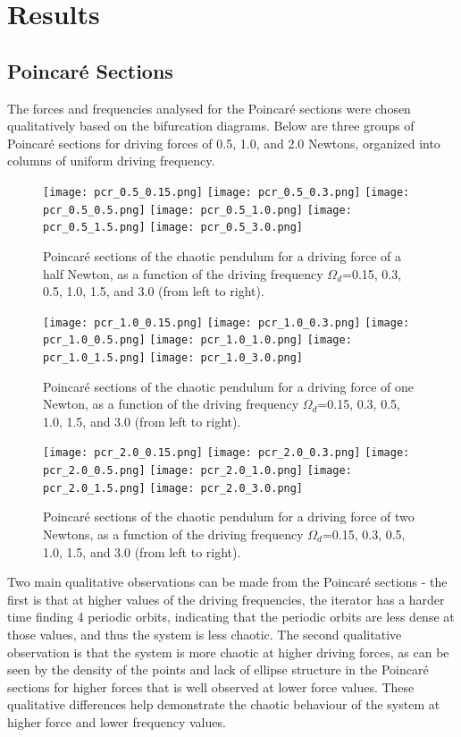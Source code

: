 \documentclass[11pt]{article} %
\begin{document}
\section{Results}
    \subsection{Poincar\'e Sections}
    The forces and frequencies analysed for the Poincar\'e sections were chosen qualitatively based on the bifurcation diagrams. Below are
    three groups of Poincar\'e sections for driving forces of 0.5, 1.0, and 2.0 Newtons, organized into columns of uniform driving frequency. 
    \begin{figure}[H]
        \centering
        \texttt{[image: pcr\_0.5\_0.15.png]}
        \texttt{[image: pcr\_0.5\_0.3.png]}
        \texttt{[image: pcr\_0.5\_0.5.png]}
        \texttt{[image: pcr\_0.5\_1.0.png]}
        \texttt{[image: pcr\_0.5\_1.5.png]}
        \texttt{[image: pcr\_0.5\_3.0.png]}
        \caption{Poincar\'e sections of the chaotic pendulum for a driving force of a half Newton, as a function of the driving frequency $\Omega_d$=0.15, 0.3, 0.5, 1.0, 1.5, and 3.0 (from left to right).}
    \end{figure}
    \begin{figure}[H]
        \centering
        \texttt{[image: pcr\_1.0\_0.15.png]}
        \texttt{[image: pcr\_1.0\_0.3.png]}
        \texttt{[image: pcr\_1.0\_0.5.png]}
        \texttt{[image: pcr\_1.0\_1.0.png]}
        \texttt{[image: pcr\_1.0\_1.5.png]}
        \texttt{[image: pcr\_1.0\_3.0.png]}
        \caption{Poincar\'e sections of the chaotic pendulum for a driving force of one Newton, as a function of the driving frequency $\Omega_d$=0.15, 0.3, 0.5, 1.0, 1.5, and 3.0 (from left to right).}
    \end{figure}
    \begin{figure}[H]
        \centering
        \texttt{[image: pcr\_2.0\_0.15.png]}
        \texttt{[image: pcr\_2.0\_0.3.png]}
        \texttt{[image: pcr\_2.0\_0.5.png]}
        \texttt{[image: pcr\_2.0\_1.0.png]}
        \texttt{[image: pcr\_2.0\_1.5.png]}
        \texttt{[image: pcr\_2.0\_3.0.png]}
        \caption{Poincar\'e sections of the chaotic pendulum for a driving force of two Newtons, as a function of the driving frequency $\Omega_d$=0.15, 0.3, 0.5, 1.0, 1.5, and 3.0 (from left to right).}
        \label{fig:poincare}
    \end{figure}
    Two main qualitative observations can be made from the Poincar\'e sections - the first is that at higher values of the driving frequencies,
    the iterator has a harder time finding 4 periodic orbits, indicating that the periodic orbits are less dense at those values, and thus
    the system is less chaotic. The second qualitative observation is that the system is more chaotic at higher driving forces, as can be seen by the
    density of the points and lack of ellipse structure in the Poincar\'e sections for higher forces that is well observed at lower force values. These
    qualitative differences help demonstrate the chaotic behaviour of the system at higher force and lower frequency values.\\
\end{document}
